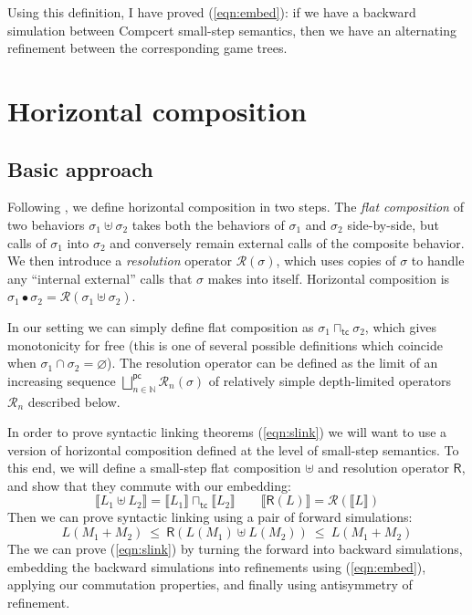\documentclass{article}
\newcommand{\kw}[1]{{\mathsf{#1}}}
\begin{document}
Using this definition,
I have proved (\ref{eqn:embed}): if we have a backward simulation between
Compcert small-step semantics,
then we have an alternating refinement between
the corresponding game trees.


\section{Horizontal composition}

\subsection{Basic approach}

Following \cite{cpp15},
we define horizontal composition in two steps.
The \emph{flat composition} of two behaviors $\sigma_1 \uplus \sigma_2$
takes both the behaviors of $\sigma_1$ and $\sigma_2$ side-by-side,
but calls of $\sigma_1$ into $\sigma_2$ and conversely remain
external calls of the composite behavior.
We then introduce a \emph{resolution} operator $\mathcal{R}(\sigma)$,
which uses copies of $\sigma$ to handle any ``internal external'' calls
that $\sigma$ makes into itself.
Horizontal composition is
$\sigma_1 \bullet \sigma_2 = \mathcal{R}(\sigma_1 \uplus \sigma_2)$.

In our setting
we can simply define flat composition as
$\sigma_1 \sqcap_\kw{tc} \sigma_2$,
which gives monotonicity for free
(this is one of several possible definitions which coincide when
$\sigma_1 \cap \sigma_2 = \varnothing$).
The resolution operator can be defined as the limit of an increasing sequence
$\bigsqcup^\kw{pc}_{n \in \mathbb{N}} \mathcal{R}_n(\sigma)$
of relatively simple depth-limited operators $\mathcal{R}_n$
described below.

In order to prove syntactic linking theorems (\ref{eqn:slink})
we will want to use a version of horizontal composition
defined at the level of small-step semantics.
To this end, we will define a small-step flat composition $\uplus$
and resolution operator $\kw{R}$,
and show that they commute with our embedding:
\[
  \llbracket L_1 \uplus L_2 \rrbracket =
    \llbracket L_1 \rrbracket \sqcap_\kw{tc}
    \llbracket L_2 \rrbracket
  \qquad
  \llbracket \kw{R}(L) \rrbracket =
    \mathcal{R}(\llbracket L \rrbracket)
\]
Then we can prove syntactic linking using a pair of forward simulations:
\[
  L(M_1 + M_2) \ \le\  \kw{R}(L(M_1) \uplus L(M_2)) \ \le\  L(M_1 + M_2)
\]
The we can prove (\ref{eqn:slink}) by
turning the forward into backward simulations,
embedding the backward simulations into refinements using (\ref{eqn:embed}),
applying our commutation properties, and
finally using antisymmetry of refinement.
\end{document}
